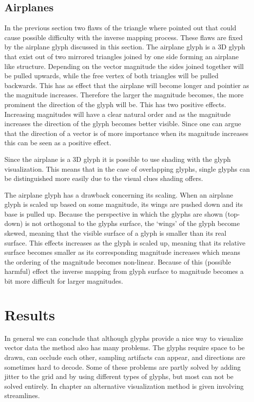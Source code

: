 \subsection{Airplanes} %
\label{sub:airplanes}
In the previous section two flaws of the triangle where pointed out that could cause possible difficulty with the inverse mapping process. These flaws are fixed by the airplane glyph discussed in this section. The airplane glyph is a 3D glyph that exist out of two mirrored triangles joined by one side forming an airplane like structure. Depending on the vector magnitude the sides joined together will be pulled upwards, while the free vertex of both triangles will be pulled backwards. This has as effect that the airplane will become longer and pointier as the magnitude increases. Therefore the larger the magnitude becomes, the more prominent the direction of the glyph will be. This has two positive effects. Increasing magnitudes will have a clear natural order and as the magnitude increases the direction of the glyph becomes better visible. Since one can argue that the direction of a vector is of more importance when its magnitude increases this can be seen as a positive effect.

Since the airplane is a 3D glyph it is possible to use shading with the glyph visualization. This means that in the case of overlapping glyphs, single glyphs can be distinguished more easily due to the visual clues shading offers. 

The airplane glyph has a drawback concerning its scaling. When an airplane glyph is scaled up based on some magnitude, its wings are pushed down and its base is pulled up. Because the perspective in which the glyphs are shown (top-down) is not orthogonal to the glyphs surface, the `wings' of the glyph become skewed, meaning that the visible surface of a glyph is smaller than its real surface. This effects increases as the glyph is scaled up, meaning that its relative surface becomes smaller as its corresponding magnitude increases which means the ordering of the magnitude becomes non-linear. Because of this (possible harmful) effect the inverse mapping from glyph surface to magnitude becomes a bit more difficult for larger magnitudes.


\section{Results} %
\label{sec:results}




In general we can conclude that although glyphs provide a nice way to visualize vector data the method also has many problems. The glyphs require space to be drawn, can occlude each other, sampling artifacts can appear, and directions are sometimes hard to decode. Some of these problems are partly solved by adding jitter to the grid and by using different types of glyphs, but most can not be solved entirely. In chapter  an alternative visualization method is given involving streamlines.


